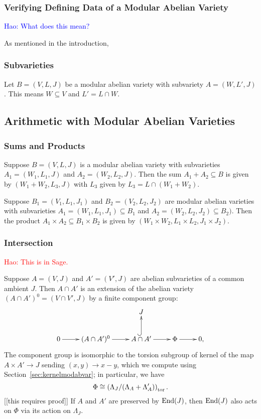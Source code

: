 \documentclass{article}
\newcommand{\Hao}[1]{\textcolor{blue}{\textsf{Hao: #1}}}
\newcommand{\Haonew}[1]{\textcolor{red}{\textsf{Hao: #1}}}
\begin{document}
\subsubsection{Verifying Defining Data of a Modular Abelian Variety}

\Hao{What does this mean?}

As mentioned in the introduction, 


\subsubsection{Subvarieties}

Let $B=(V, L, J)$ be a modular abelian variety with subvariety $A=(W, L', J)$.
This means $W\subseteq V$ and $L' = L\cap W$.

\subsection{Arithmetic with Modular Abelian Varieties}

\subsubsection{Sums and Products}

Suppose $B=(V, L, J)$ is a modular abelian variety with subvarieties $A_1=(W_1,
L_1, J)$ and $A_2=(W_2, L_2, J)$. Then the sum $A_1+A_2\subseteq B$ is given by
$(W_1+W_2, L_3, J)$ with $L_3$ given by $L_3 = L\cap (W_1+W_2)$.

Suppose $B_1=(V_1, L_1, J_1)$ and $B_2=(V_2, L_2, J_2)$ are modular abelian
varieties with subvarieties $A_1=(W_1, L_1, J_1)\subseteq B_1$ and $A_2=(W_2,
L_2, J_2)\subseteq B_2)$. Then the product $A_1\times A_2\subseteq B_1\times
B_2$ is given by $(W_1\times W_2, L_1\times L_2, J_1\times J_2)$.

\subsubsection{Intersection}

\Haonew{This is in Sage.}

Suppose $A = (V,J)$ and $A' = (V', J)$ are abelian subvarieties of a
common ambient $J$.  Then $A\cap A'$ is an extension of the abelian
variety $(A\cap A')^0 = (V\cap V', J)$ by a finite component group:
$$
\xymatrix{
   & & J & & \\
   0\ar[r]& (A\cap A')^0 \ar[r]&  A\cap A'\ar@{^(->}[u] \ar[r]& \Phi\ar[r] & 0,
}
$$
The component group is isomorphic to the torsion subgroup of kernel of
the map $A \times A' \to J$ sending $(x,y)\to x-y$, which we compute
using Section~\ref{sec:kernelmodabvar}; in particular, we have
$$
   \Phi \cong \left( \Lambda_J/(\Lambda_A + \Lambda_A')\right)_{\operatorname{tor}}.
$$
[[this requires proof]]
If $A$ and $A'$ are preserved by $\operatorname{End}(J)$, then $\operatorname{End}(J)$ also
acts on $\Phi$ via its action on $\Lambda_J$.
\end{document}
